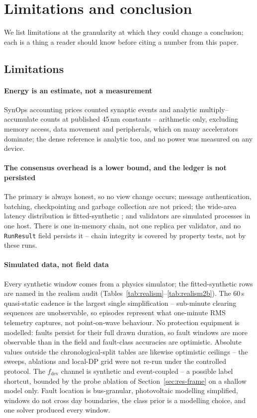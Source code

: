 \section{Limitations and conclusion}
\label{sec:limitations}

We list limitations at the granularity at which they could change a
conclusion; each is a thing a reader should know before citing a number
from this paper.

\subsection{Limitations}
\label{sec:limitations-list}

\paragraph{Energy is an estimate, not a measurement}
SynOps accounting prices counted synaptic events and analytic
multiply--accumulate counts at published 45\,nm constants
\cite{horowitz2014} -- arithmetic only, excluding memory access, data
movement and peripherals, which on many accelerators dominate; the dense
reference is analytic too, and no power was measured on any device.

\paragraph{The consensus overhead is a lower bound, and the ledger is
not persisted}
The primary is always honest, so no view change occurs; message
authentication, batching, checkpointing and garbage collection are not
priced; the wide-area latency distribution is fitted-synthetic
\cite{aikat2003}; and validators are simulated processes
in one host. There is one in-memory chain, not one replica per
validator, and no \texttt{RunResult} field persists it -- chain
integrity is covered by property tests, not by these runs.

\paragraph{Simulated data, not field data}
Every synthetic window comes from a physics simulator; the
fitted-synthetic rows are named in the realism audit
(Tables~\ref{tab:realism}--\ref{tab:realism2b}). The 60\,s quasi-static
cadence is the largest single simplification -- sub-minute clearing
sequences are unobservable, so episodes represent what one-minute RMS
telemetry captures, not point-on-wave behaviour. No protection equipment
is modelled: faults persist for their full drawn duration, so fault
windows are more observable than in the field and fault-class accuracies
are optimistic. Absolute \macroF{} values outside the
chronological-split tables are likewise optimistic ceilings -- the
sweeps, ablations and local-DP grid were not re-run under the controlled
protocol. The $f_{\mathrm{dev}}$ channel is synthetic and event-coupled
-- a possible label shortcut, bounded by the probe ablation of
Section~\ref{sec:res-frame} on a shallow model only. Fault location is
bus-granular, photovoltaic modelling simplified, windows do not cross
day boundaries, the class prior is a modelling choice, and one solver
produced every window.

